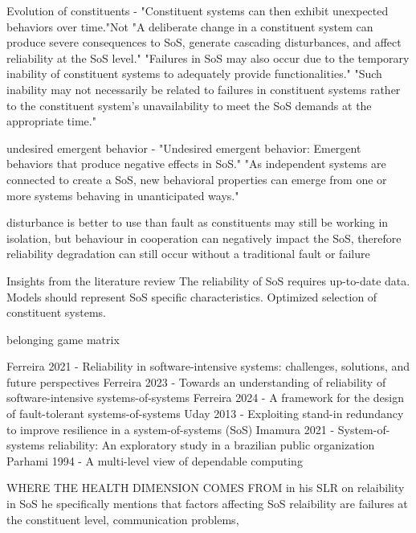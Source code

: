 Evolution of constituents - 
"Constituent systems can then exhibit unexpected behaviors over time."Not
"A deliberate change in a constituent system can produce severe consequences to SoS, generate cascading disturbances, and affect reliability at the SoS level."
"Failures in SoS may also occur due to the temporary inability of constituent systems to adequately provide functionalities."
"Such inability may not necessarily be related to failures in constituent systems rather to the constituent system's unavailability to meet the SoS demands at the appropriate time."


undesired emergent behavior -
"Undesired emergent behavior: Emergent behaviors that produce negative effects in SoS."
"As independent systems are connected to create a SoS, new behavioral properties can emerge from one or more systems behaving in unanticipated ways."


disturbance is better to use than fault as constituents may still be working in isolation, but behaviour in cooperation can negatively impact the SoS, therefore reliability degradation can still occur without a traditional fault or failure

\cite{ferreira2021reliability}
Insights from the literature review
The reliability of SoS requires up-to-date data. 
Models should represent SoS specific characteristics.
Optimized selection of constituent systems. 





\cite{axelsson2019refined}



\cite{baldwin2011formation}
belonging game matrix


\cite{salado2015abandonment}


\cite{salado2016exile}



Ferreira 2021 - Reliability in software-intensive systems: challenges, solutions, and future perspectives
Ferreira 2023 -  Towards an understanding of reliability of software-intensive systems-of-systems
Ferreira 2024 - A framework for the design of fault-tolerant systems-of-systems
Uday 2013 - Exploiting stand-in redundancy to improve resilience in a system-of-systems (SoS)
Imamura 2021 - System-of-systems reliability: An exploratory study in a brazilian public organization
Parhami 1994 - A multi-level view of dependable computing


WHERE THE HEALTH DIMENSION COMES FROM
\cite{ferreira2021reliability} in his SLR on relaibility in SoS he specifically mentions that factors affecting SoS relaibility are failures at the constituent level, communication problems, 

